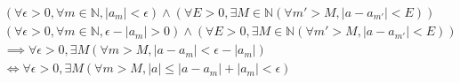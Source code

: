 \documentclass[a4j]{jarticle}
\begin{document}
\begin{align}
    &(\forall \epsilon>0, \forall m \in \mathbb{N}, |a_m|<\epsilon) \wedge (\forall E>0, \exists M  \in \mathbb{N} (\forall m'>M, |a-a_{m'}|<E) ) \\
    &(\forall \epsilon>0, \forall m \in \mathbb{N}, \epsilon-|a_m|>0) \wedge (\forall E>0, \exists M  \in \mathbb{N} (\forall m'>M, |a-a_{m'}|<E) ) \\
    &\implies \forall \epsilon>0, \exists M (\forall m>M, |a-a_m|<\epsilon-|a_m|) \\
    &\iff \forall \epsilon>0, \exists M (\forall m>M, |a|\leq |a-a_m|+|a_m|<\epsilon)
\end{align}
\end{document}
